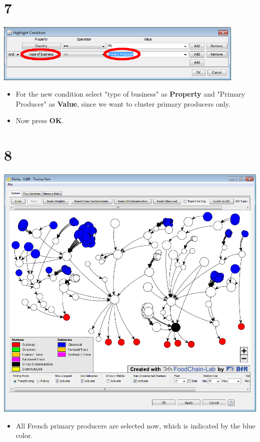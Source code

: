 \documentclass{beamer}
\begin{document}
\section{7}
\begin{frame}
	\begin{center}
  		\includegraphics[width=0.9\textwidth]{7.png}
	\end{center}
	\begin{itemize}
		\item For the new condition select "type of business" as \textbf{Property} and "Primary Producer" as \textbf{Value}, since we want to cluster primary producers only.
		\item Now press \textbf{OK}.
	\end{itemize}
\end{frame}


\section{8}
\begin{frame}
	\begin{center}
  		\includegraphics[height=0.6\textheight]{8.png}
	\end{center}
	\begin{itemize}
		\item All French primary producers are selected now, which is indicated by the blue color.
	\end{itemize}
\end{frame}
\end{document}
